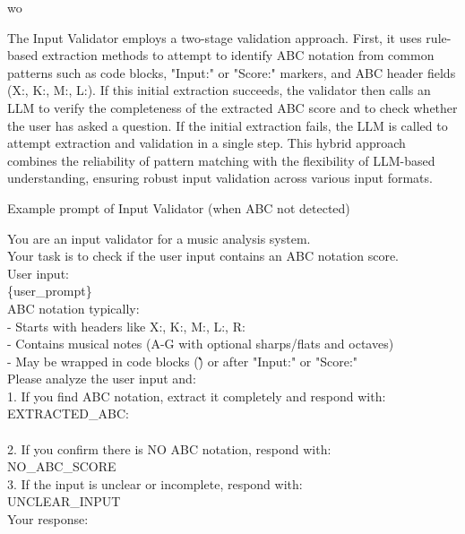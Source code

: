 wo\documentclass[sigconf]{acmart}
\begin{document}
The Input Validator employs a two-stage validation approach. First, it uses rule-based extraction methods to attempt to identify ABC notation from common patterns such as code blocks, "Input:" or "Score:" markers, and ABC header fields (X:, K:, M:, L:). If this initial extraction succeeds, the validator then calls an LLM to verify the completeness of the extracted ABC score and to check whether the user has asked a question. If the initial extraction fails, the LLM is called to attempt extraction and validation in a single step. This hybrid approach combines the reliability of pattern matching with the flexibility of LLM-based understanding, ensuring robust input validation across various input formats.

\begin{promptbox}{Example prompt of Input Validator (when ABC not detected)}

You are an input validator for a music analysis system.\\

Your task is to check if the user input contains an ABC notation score.\\

User input:\\
\{user\_prompt\}\\

ABC notation typically:\\
- Starts with headers like X:, K:, M:, L:, R:\\
- Contains musical notes (A-G with optional sharps/flats and octaves)\\
- May be wrapped in code blocks (\`\`\`) or after "Input:" or "Score:"\\

Please analyze the user input and:\\
1. If you find ABC notation, extract it completely and respond with:\\
   EXTRACTED\_ABC:\\
   [the complete ABC score here]\\

2. If you confirm there is NO ABC notation, respond with:\\
   NO\_ABC\_SCORE\\

3. If the input is unclear or incomplete, respond with:\\
   UNCLEAR\_INPUT\\

Your response:
\end{promptbox}
\end{document}
